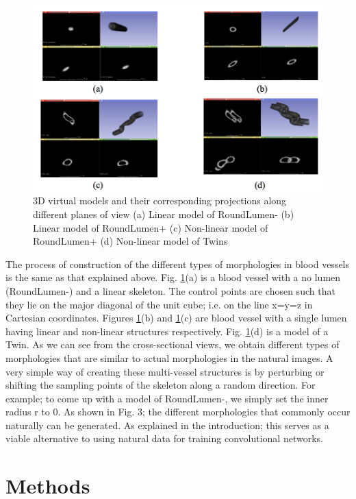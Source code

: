 \begin{figure}[H]
\centering
\includegraphics[width=1.0\textwidth]{img/slicer}
\caption{3D virtual models and their corresponding projections along different planes of view (a) Linear model of RoundLumen- (b) Linear model of RoundLumen+ (c) Non-linear model of RoundLumen+ (d) Non-linear model of Twins}
\label{fig:slicer}
\end{figure}

The process of construction of the different types of morphologies in blood vessels is the same as that explained above. Fig.  \ref{fig:slicer}(a) is a blood vessel with a no lumen (RoundLumen-) and a linear skeleton. The control points are chosen such that they lie on the major diagonal of the unit cube; i.e. on the line x=y=z in Cartesian coordinates.  Figures  \ref{fig:slicer}(b) and  \ref{fig:slicer}(c) are blood vessel with a single lumen having linear and non-linear structures respectively. Fig.  \ref{fig:slicer}(d) is a model of a Twin. As we can see from the cross-sectional views, we obtain different types of morphologies that are similar to actual morphologies in the natural images. A very simple way of creating these multi-vessel structures is by perturbing or shifting the sampling points of the skeleton along a random direction. For example; to come up with a model of RoundLumen-, we simply set the inner radius r to 0. As shown in Fig. 3; the different morphologies that commonly occur naturally can be generated. As explained in the introduction; this serves as a viable alternative to using natural data for training convolutional networks.

\section{Methods}

